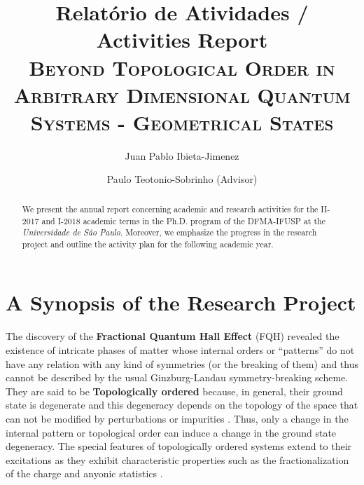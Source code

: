 \documentclass[titlepage,11pt]{article}
\theoremstyle{plain}%
\theoremstyle{definition}
\theoremstyle{remark}
\begin{document}

\title{Relat\'{o}rio de Atividades / Activities Report\\\textsc{Beyond Topological Order in Arbitrary Dimensional Quantum Systems - Geometrical States}}


	\author[a]{Juan Pablo Ibieta-Jimenez}
  \author[a]{ Paulo Teotonio-Sobrinho (Advisor)}
\maketitle

\begin{abstract}
We present the annual report concerning academic and research activities for the II-2017 and I-2018 academic terms in the Ph.D. program of the DFMA-IFUSP at the \emph{Universidade de S\~{a}o Paulo}. Moreover, we emphasize the progress in the research project and outline the activity plan for the following academic year.
\end{abstract}






\section{A Synopsis of the Research Project}\label{S:1}

The discovery of the \textbf{Fractional Quantum Hall Effect} (FQH) \cite{Laughlin} revealed the existence of intricate phases of matter whose internal orders or ``patterns'' do not have any relation with any kind of symmetries (or the breaking of them) and thus cannot be described by the usual Ginzburg-Landau symmetry-breaking scheme. They are said to be \textbf{Topologically ordered} because, in general, their ground state is degenerate and this degeneracy depends on the topology of the space \cite{Haldane,Wen3,Wen4} that can not be modified by perturbations or impurities \cite{Wen1}. Thus, only a change in the internal pattern or topological order  can induce a change in the ground state degeneracy. The special features of topologically ordered systems extend to their excitations as they exhibit characteristic properties such as the fractionalization of the charge and anyonic statistics \cite{Oshikawa-Senthil, Oshikawa}. 
\end{document}
